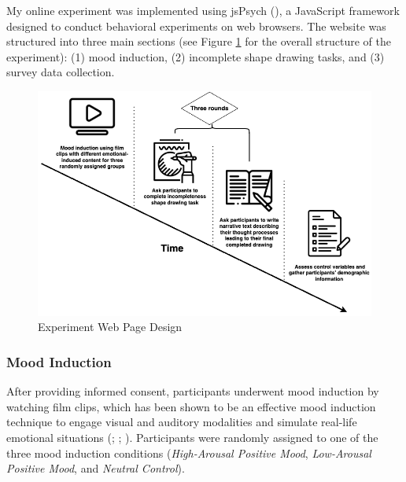 \documentclass[../MA_Thesis.tex]{subfiles}
\begin{document}
My online experiment was implemented using jsPsych (\cite{leeuw_jspsych_2023}), a JavaScript framework designed to conduct behavioral experiments on web browsers. The website was structured into three main sections (see Figure \ref{fig: Experiment Web Page Design} for the overall structure of the experiment): (1) mood induction, (2) incomplete shape drawing tasks, and (3) survey data collection.

\begin{figure}
    \centering
    \includegraphics[width=0.7\linewidth, keepaspectratio]{drawio/Experiment Timeline.png}
    \caption{Experiment Web Page Design}
    \label{fig: Experiment Web Page Design}
\end{figure}

\subsubsection*{Mood Induction}
After providing informed consent, participants underwent mood induction by watching film clips, which has been shown to be an effective mood induction technique to engage visual and auditory modalities and simulate real-life emotional situations (\cite{coan_handbook_2007}; \cite{fernandez-aguilar_how_2019}; \cite{siedlecka_experimental_2019}). Participants were randomly assigned to one of the three mood induction conditions (\textit{High-Arousal Positive Mood}, \textit{Low-Arousal Positive Mood}, and \textit{Neutral Control}). 
\end{document}
